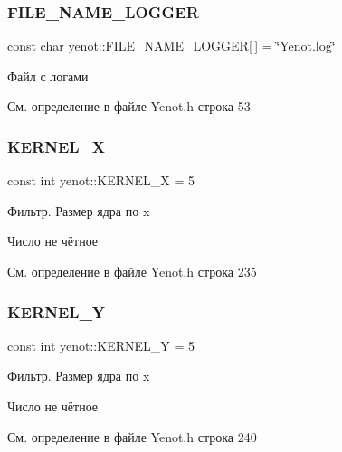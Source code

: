 \subsubsection{\texorpdfstring{F\+I\+L\+E\+\_\+\+N\+A\+M\+E\+\_\+\+L\+O\+G\+G\+ER}{FILE\_NAME\_LOGGER}}
{\footnotesize\ttfamily const char yenot\+::\+F\+I\+L\+E\+\_\+\+N\+A\+M\+E\+\_\+\+L\+O\+G\+G\+ER\mbox{[}$\,$\mbox{]} = \char`\"{}Yenot.\+log\char`\"{}}



Файл с логами 



См. определение в файле Yenot.\+h строка 53

\mbox{\label{namespaceyenot_aa753d0e3e99fb4b37b3930996bdfe563}} 
\subsubsection{\texorpdfstring{K\+E\+R\+N\+E\+L\+\_\+X}{KERNEL\_X}}
{\footnotesize\ttfamily const int yenot\+::\+K\+E\+R\+N\+E\+L\+\_\+X = 5}

Фильтр. Размер ядра по x

Число не чётное 

См. определение в файле Yenot.\+h строка 235

\mbox{\label{namespaceyenot_a33a5af73a30e2b5684ee02cc4bf4c374}} 
\subsubsection{\texorpdfstring{K\+E\+R\+N\+E\+L\+\_\+Y}{KERNEL\_Y}}
{\footnotesize\ttfamily const int yenot\+::\+K\+E\+R\+N\+E\+L\+\_\+Y = 5}

Фильтр. Размер ядра по x

Число не чётное 

См. определение в файле Yenot.\+h строка 240

\mbox{\label{namespaceyenot_a08c0d88b074bcba3b7d79d019211a1ac}} 
